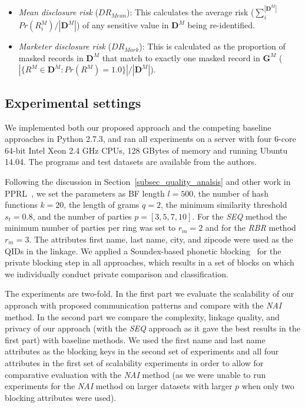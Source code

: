 \documentclass{sig-alternate}
\begin{document}
\begin{itemize}
\item \emph{Mean disclosure risk} ($DR_{Mean}$): This calculates the average risk 
      ($\sum_i^{|\mathbf{D}^M|}$ $Pr(R_i^M)/|\mathbf{D}^M|$) of any sensitive value in $\mathbf{D}^M$ being re-identified.

\item \emph{Marketer disclosure risk} ($DR_{Mark}$): This is calculated as the proportion of masked records 
in $\mathbf{D}^M$ that
match to exactly one masked record in $\mathbf{G}^M$ ($|\{R^M \in \mathbf{D}^M: Pr(R^M) = 1.0\}| /|\mathbf{D}^M|$).
\end{itemize}

\subsection{Experimental settings}
\label{sec-settings}

We implemented both our proposed approach and the competing 
baseline approaches in Python 2.7.3,
and ran all experiments on a server with 
four 6-core 64-bit Intel Xeon
2.4 GHz CPUs, 128 GBytes of memory and running Ubuntu 14.04. The
programs and test datasets are available from the authors. 

Following the discussion in Section~\ref{subsec_quality_analsis}
and other work in PPRL~\cite{Dur13,Sch09,Vat12}, 
we set the parameters as
BF length $l=500$, the number of hash functions
$k=20$, the length of grams $q=2$, the minimum similarity
threshold $s_t=0.8$, and the number of parties $p=[3,5,7,10]$. 
For the \emph{SEQ} method the minimum number of parties per
ring was set to $r_m = 2$ and
for the \emph{RBR} method $r_m=3$.
The attributes first name, last name, city, and
zipcode were used as the QIDs in the linkage.
We applied a
Soundex-based phonetic blocking~\cite{Chr12} 
for the private blocking step in all approaches,
which results in a set of blocks on which we individually conduct 
private comparison and classification.

The experiments are two-fold.
In the first part we evaluate the scalability of our approach
with proposed communication patterns and compare with the \emph{NAI} method.
In the second part we compare the complexity, linkage quality, and privacy
of our approach (with the \emph{SEQ} approach as it gave the best results
in the first part) with baseline methods.
We used the first name and last name attributes as the blocking keys
in the second set of experiments and all four attributes 
in the first set of scalability experiments in order to
allow for comparative evaluation with the \emph{NAI} method
(as we were unable to run experiments for the \emph{NAI} method on larger datasets
with larger $p$ when only two blocking attributes were used).
\end{document}
